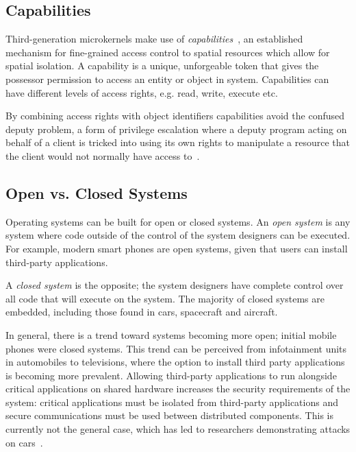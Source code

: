 \subsection{Capabilities}
\label{s:b-capabilities}

Third-generation microkernels make use of \emph{capabilities}~\citep{Dennis_VanHorn_66}, an
established mechanism for fine-grained access control to spatial resources which allow for spatial
    isolation. A capability is a unique, unforgeable token that gives the possessor permission to access
an entity or object in system. Capabilities can have different levels of access rights, e.g. read,
write, execute etc. 

By combining access rights with object identifiers capabilities avoid the
confused deputy problem, a form of privilege escalation where a deputy program
acting on behalf of a client is  tricked into using
its own rights to manipulate a resource that the client would not normally have access
to~\citep{Hardy_88}. 

\subsection{Open vs. Closed Systems}

Operating systems can be built for open or closed systems.  An \emph{open system} is any system
where code outside of the control of the system designers can be executed. For example, modern
smart phones are open systems, given that users can install third-party applications.

A \emph{closed system} is the opposite; the system designers have complete control over all code
that will execute on the system.  The majority of closed systems are embedded, including those found
in cars, spacecraft and aircraft.

In general, there is a trend toward systems becoming more open; initial mobile phones were closed
systems.  This trend can be perceived from infotainment units in automobiles to televisions, where
the option to install third party applications is becoming more prevalent.  Allowing third-party
applications to run alongside critical applications on shared hardware increases the security
requirements of the system: critical applications must be isolated from third-party applications and
secure communications must be used between distributed components.  This is currently not the
general case, which has led to researchers demonstrating attacks on
cars~\citep{Checkoway_MKASSKCRK_11}.

